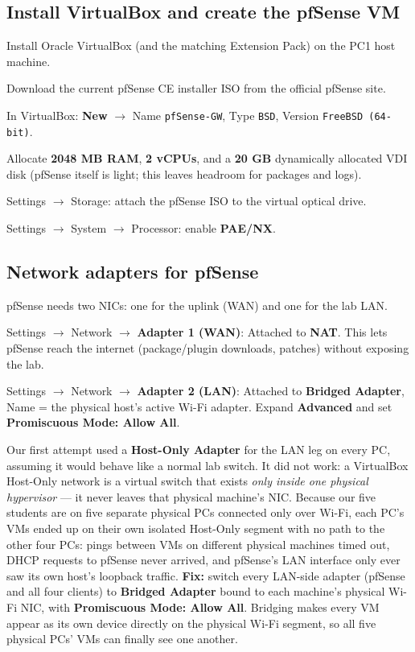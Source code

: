 \documentclass[11pt,a4paper]{article}
\begin{document}
\subsection{Install VirtualBox and create the pfSense VM}
\begin{steps}
\item Install Oracle VirtualBox (and the matching Extension Pack) on the PC1 host machine.
\item Download the current pfSense CE installer ISO from the official pfSense site.
\item In VirtualBox: \textbf{New} $\to$ Name \texttt{pfSense-GW}, Type \texttt{BSD},
  Version \texttt{FreeBSD (64-bit)}.
\item Allocate \textbf{2048 MB RAM}, \textbf{2 vCPUs}, and a \textbf{20 GB} dynamically
  allocated VDI disk (pfSense itself is light; this leaves headroom for packages and logs).
\item Settings $\to$ Storage: attach the pfSense ISO to the virtual optical drive.
\item Settings $\to$ System $\to$ Processor: enable \textbf{PAE/NX}.
\end{steps}

\subsection{Network adapters for pfSense}
pfSense needs two NICs: one for the uplink (WAN) and one for the lab LAN.
\begin{steps}
\item Settings $\to$ Network $\to$ \textbf{Adapter 1 (WAN)}: Attached to
  \textbf{NAT}. This lets pfSense reach the internet (package/plugin downloads,
  patches) without exposing the lab.
\item Settings $\to$ Network $\to$ \textbf{Adapter 2 (LAN)}: Attached to
  \textbf{Bridged Adapter}, Name = the physical host's active Wi-Fi adapter. Expand
  \textbf{Advanced} and set \textbf{Promiscuous Mode: Allow All}.
\end{steps}

\begin{troublebox}
Our first attempt used a \textbf{Host-Only Adapter} for the LAN leg on every PC,
assuming it would behave like a normal lab switch. It did not work: a VirtualBox
Host-Only network is a virtual switch that exists \emph{only inside one physical
hypervisor} --- it never leaves that physical machine's NIC. Because our five students
are on five separate physical PCs connected only over Wi-Fi, each PC's VMs ended up on
their own isolated Host-Only segment with no path to the other four PCs: pings between
VMs on different physical machines timed out, DHCP requests to pfSense never arrived,
and pfSense's LAN interface only ever saw its own host's loopback traffic.
\textbf{Fix:} switch every LAN-side adapter (pfSense and all four clients) to
\textbf{Bridged Adapter} bound to each machine's physical Wi-Fi NIC, with
\textbf{Promiscuous Mode: Allow All}. Bridging makes every VM appear as its own device
directly on the physical Wi-Fi segment, so all five physical PCs' VMs can finally see
one another.
\end{troublebox}
\end{document}
